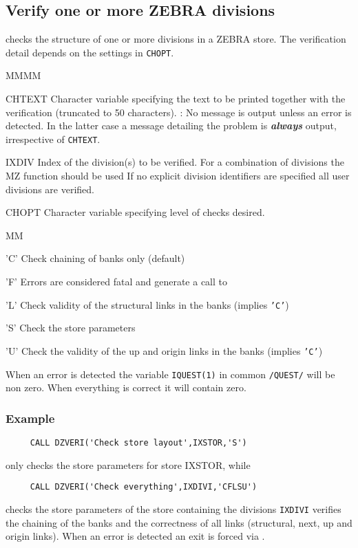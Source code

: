 \subsection{Verify one or more ZEBRA divisions}
\par {} checks the structure of one or more divisions in a ZEBRA
store. The verification detail depends on the settings in {\tt CHOPT}.
\Idesc
\begin{DL}{MMMM}
\item[CHTEXT]Character variable specifying the text to be printed
together with the verification (truncated to 50 characters).
: No message is output unless an error is detected.
In the latter case a message detailing the problem is
{\bf\it always} output, irrespective of {\tt CHTEXT}.
\item[IXDIV]Index of the division(s) to be verified.
\newline For a combination of divisions the MZ function  should
be used
\newline If no explicit division identifiers are specified
all user divisions are verified.
\item[CHOPT]Character variable specifying level of checks desired.
\begin{DL}{MM}
\item['C']Check chaining of banks only (default)
\item['F']Errors are considered fatal and generate a call to 
\item['L']Check validity of the structural links in the banks
(implies {\tt'C'})
\item['S']Check the store parameters
\item['U']Check the validity of the up and origin links in the banks
(implies {\tt'C'})
\end{DL}
\end{DL}
\par
When an error is detected the variable {\tt IQUEST(1)} in common {\tt/QUEST/}
will be non zero. When everything is correct it will contain zero.
\subsubsection{Example}
\begin{verbatim}
     CALL DZVERI('Check store layout',IXSTOR,'S')
\end{verbatim}
only checks the store parameters for store IXSTOR, while
\begin{verbatim}
     CALL DZVERI('Check everything',IXDIVI,'CFLSU')
\end{verbatim}
checks the store parameters of the store containing
the divisions {\tt IXDIVI}
verifies the chaining of the banks and the correctness of all
links (structural, next, up and origin links). When an error is
detected an exit is forced via .

